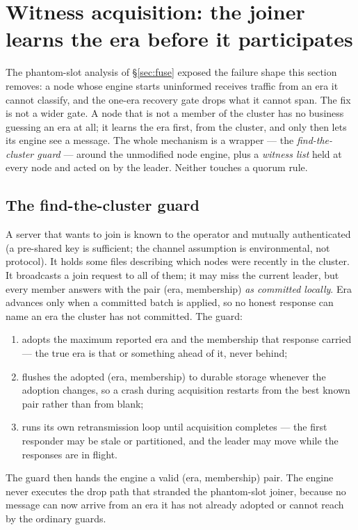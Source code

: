 \section{Witness acquisition: the joiner learns the era before it
participates}\label{sec:witness}

The phantom-slot analysis of \S\ref{sec:fuse} exposed the failure shape this
section removes: a node whose engine starts uninformed receives traffic from
an era it cannot classify, and the one-era recovery gate drops what it
cannot span. The fix is not a wider gate. A node that is not a member of the
cluster has no business guessing an era at all; it learns the era first,
from the cluster, and only then lets its engine see a message. The whole
mechanism is a wrapper --- the \emph{find-the-cluster guard} --- around the
unmodified node engine, plus a \emph{witness list} held at every node and
acted on by the leader. Neither touches a quorum rule.

\subsection{The find-the-cluster guard}
A server that wants to join is known to the operator and mutually
authenticated (a pre-shared key is sufficient; the channel assumption is
environmental, not protocol). It holds some files describing which nodes
were recently in the cluster. It broadcasts a join request to all of them;
it may miss the current leader, but every member answers with the pair
(era, membership) \emph{as committed locally}. Era advances only when a
committed batch is applied, so no honest response can name an era the
cluster has not committed. The guard:
\begin{enumerate}
\item adopts the maximum reported era and the membership that response
  carried --- the true era is that or something ahead of it, never behind;
\item flushes the adopted (era, membership) to durable storage whenever the
  adoption changes, so a crash during acquisition restarts from the best
  known pair rather than from blank;
\item runs its own retransmission loop until acquisition completes --- the
  first responder may be stale or partitioned, and the leader may move
  while the responses are in flight.
\end{enumerate}
The guard then hands the engine a valid (era, membership) pair. The engine
never executes the drop path that stranded the phantom-slot joiner, because
no message can now arrive from an era it has not already adopted or cannot
reach by the ordinary guards.

